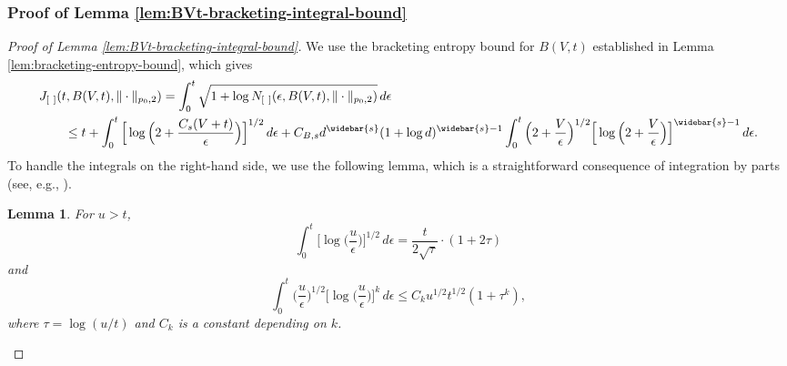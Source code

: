 \documentclass[10pt]{article}
\newtheorem{lemma}{Lemma}
\begin{document}
\subsubsection{Proof of Lemma \ref{lem:BVt-bracketing-integral-bound}}
\label{pf:BVt-bracketing-integral-bound}
\begin{proof}[Proof of Lemma \ref{lem:BVt-bracketing-integral-bound}]
We use the bracketing entropy bound for $B(V, t)$ established in 
Lemma \ref{lem:bracketing-entropy-bound}, which gives
\begin{equation*}
\begin{aligned}
    &J_{[ \ ]}(t, B(V, t), \| \cdot \|_{p_0, 2})
    = \int_{0}^{t} \sqrt{1 
    + \log N_{[ \ ]}(\epsilon, B(V, t), \| \cdot \|_{p_0, 2})} \, d\epsilon \\
    &\qquad \le t + \int_{0}^{t} \Big[\log\Big(2 
    + \frac{C_s(V + t)}{\epsilon}\Big)\Big]^{1/2} \, d\epsilon
    + C_{B, s} d^{\widebar{s}}(1 + \log d)^{\widebar{s} - 1} 
    \int_{0}^{t} \Big(2 + \frac{V}{\epsilon}\Big)^{1/2}
    \Big[\log\Big(2 + \frac{V}{\epsilon}\Big)\Big]^{\widebar{s} - 1} \, d\epsilon.
\end{aligned}
\end{equation*}
To handle the integrals on the right-hand side, we use the following lemma, 
which is a straightforward consequence of integration by parts (see, e.g., 
\citet[Lemma 11.7]{ki2024mars}).
\begin{lemma}\label{lem:integration-by-parts}
    For $u > t$, 
    \begin{equation*}
        \int_{0}^{t} \Big[\log\Big(\frac{u}{\epsilon}\Big)\Big]^{1/2} 
        \, d\epsilon
        = \frac{t}{2\sqrt{\tau}} \cdot (1 + 2\tau)
    \end{equation*} 
    and 
    \begin{equation*}
        \int_{0}^{t} \Big(\frac{u}{\epsilon}\Big)^{1/2} 
        \Big[\log\Big(\frac{u}{\epsilon}\Big)\Big]^k 
        \, d\epsilon
        \le C_k u^{1/2} t^{1/2} (1 + \tau^k),
    \end{equation*}
    where $\tau = \log(u/t)$ and $C_k$ is a constant depending on $k$.
\end{lemma}


\end{proof}
\end{document}
